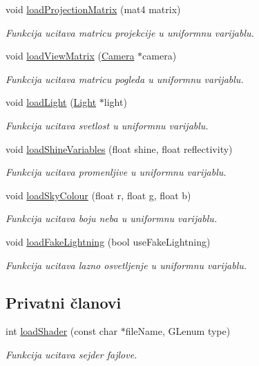 \begin{DoxyCompactItemize}
void \hyperlink{classshader_1_1Shader_a574d7ff5ab4870990795f72014e1aa1e}{load\+Projection\+Matrix} (mat4 matrix)
\begin{DoxyCompactList}\small\item\em Funkcija ucitava matricu projekcije u uniformnu varijablu. \end{DoxyCompactList}\item 
void \hyperlink{classshader_1_1Shader_ad7b79e54bfa3f757e3cf0104904e3dc3}{load\+View\+Matrix} (\hyperlink{classentity_1_1Camera}{Camera} $\ast$camera)
\begin{DoxyCompactList}\small\item\em Funkcija ucitava matricu pogleda u uniformnu varijablu. \end{DoxyCompactList}\item 
void \hyperlink{classshader_1_1Shader_abe287aa3d352de4e8aac6677666b90d1}{load\+Light} (\hyperlink{classentity_1_1Light}{Light} $\ast$light)
\begin{DoxyCompactList}\small\item\em Funkcija ucitava svetlost u uniformnu varijablu. \end{DoxyCompactList}\item 
void \hyperlink{classshader_1_1Shader_acd4755a3b83ebb6b0577832609cc520f}{load\+Shine\+Variables} (float shine, float reflectivity)
\begin{DoxyCompactList}\small\item\em Funkcija ucitava promenljive u uniformnu varijablu. \end{DoxyCompactList}\item 
void \hyperlink{classshader_1_1Shader_ace9f5d9ac79e04082aafa33c22d9f96c}{load\+Sky\+Colour} (float r, float g, float b)
\begin{DoxyCompactList}\small\item\em Funkcija ucitava boju neba u uniformnu varijablu. \end{DoxyCompactList}\item 
void \hyperlink{classshader_1_1Shader_a124ef086687ad7bcb0050c9fd1b13a24}{load\+Fake\+Lightning} (bool use\+Fake\+Lightning)
\begin{DoxyCompactList}\small\item\em Funkcija ucitava lazno osvetljenje u uniformnu varijablu. \end{DoxyCompactList}\end{DoxyCompactItemize}
\subsection*{Privatni članovi}
\begin{DoxyCompactItemize}
\item 
int \hyperlink{classshader_1_1Shader_aeabeeeb9e04b2704d6b22ff4a472afae}{load\+Shader} (const char $\ast$file\+Name, G\+Lenum type)
\begin{DoxyCompactList}\small\item\em Funkcija ucitava sejder fajlove. \end{DoxyCompactList}\end{DoxyCompactItemize}
